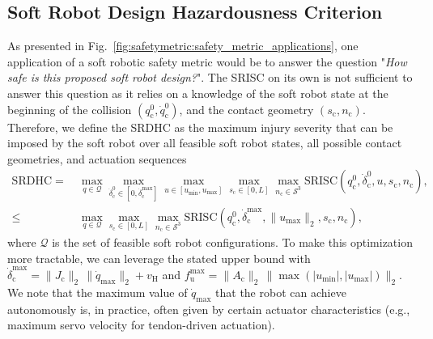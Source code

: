 \subsection{Soft Robot Design Hazardousness Criterion}
As presented in Fig.~\ref{fig:safetymetric:safety_metric_applications}, one application of a soft robotic safety metric would be to answer the question "\emph{How safe is this proposed soft robot design?}". The \gls{SRISC} on its own is not sufficient to answer this question as it relies on a knowledge of the soft robot state at the beginning of the collision $(q_{\mathrm{c}}^0, \dot{q}_{\mathrm{c}}^0)$, and the contact geometry $(s_\mathrm{c},n_\mathrm{c})$.
Therefore, we define the \gls{SRDHC} as the maximum injury severity that can be imposed by the soft robot over all feasible soft robot states, all possible contact geometries, and actuation sequences~\citep{wassink2007towards}
\begin{equation}
\begin{split}
    \mathrm{SRDHC} =& \: \max_{q \in \mathcal{Q}} \max_{\dot{\delta}_\mathrm{c}^0 \in [0,\dot{\delta}_\mathrm{c}^\mathrm{max}]} \max_{u \in [u_\mathrm{min}, u_\mathrm{max}]} \max_{s_\mathrm{c} \in [0,L]} \max_{n_\mathrm{c} \in \mathcal{S}^3} \mathrm{SRISC}(q_{\mathrm{c}}^0,\dot{\delta}_\mathrm{c}^0,u,s_\mathrm{c},n_\mathrm{c}),\\
    \leq& \: \max_{q \in \mathcal{Q}} \max_{s_\mathrm{c} \in [0,L]} \max_{n_\mathrm{c} \in \mathcal{S}^3} \mathrm{SRISC}(q_{\mathrm{c}}^0,\dot{\delta}_\mathrm{c}^\mathrm{max},\lVert u_\mathrm{max} \rVert_2,s_\mathrm{c},n_\mathrm{c}),
\end{split}
\end{equation}
where $\mathcal{Q}$ is the set of feasible soft robot configurations.
To make this optimization more tractable, we can leverage the stated upper bound with $\dot{\delta}_\mathrm{c}^\mathrm{max} = \lVert J_\mathrm{c} \rVert_2 \, \lVert \dot{q}_\mathrm{max} \rVert_2 + v_\mathrm{H}$
and $f_\mathrm{u}^\mathrm{max} = \lVert A_\mathrm{c} \rVert_2 \, \lVert \max(|u_\mathrm{min}|,|u_\mathrm{max}|) \rVert_2$.
We note that the maximum value of $\dot{q}_\mathrm{max}$ that the robot can achieve autonomously is, in practice, often given by certain actuator characteristics (e.g., maximum servo velocity for tendon-driven actuation).

